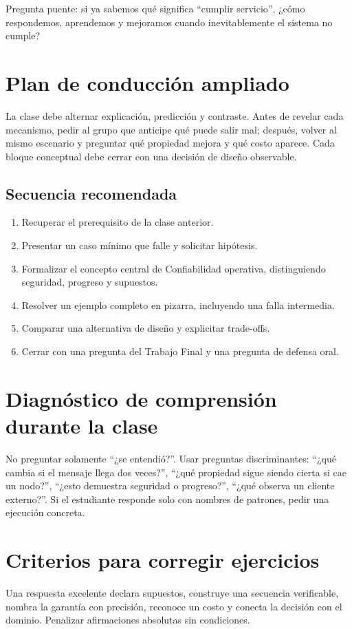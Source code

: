 \documentclass[variant=docente,cover=institutional,mode=screen]{ua-engineering-v6-article}
\begin{document}
\begin{uakeybox}
Pregunta puente: si ya sabemos qué significa “cumplir servicio”, ¿cómo respondemos, aprendemos y mejoramos cuando inevitablemente el sistema no cumple?
\end{uakeybox}


\section{Plan de conducción ampliado}
La clase debe alternar explicación, predicción y contraste. Antes de revelar cada mecanismo, pedir al grupo que anticipe qué puede salir mal; después, volver al mismo escenario y preguntar qué propiedad mejora y qué costo aparece. Cada bloque conceptual debe cerrar con una decisión de diseño observable.
\subsection*{Secuencia recomendada}
\begin{enumerate}
\item Recuperar el prerequisito de la clase anterior.
\item Presentar un caso mínimo que falle y solicitar hipótesis.
\item Formalizar el concepto central de Confiabilidad operativa, distinguiendo seguridad, progreso y supuestos.
\item Resolver un ejemplo completo en pizarra, incluyendo una falla intermedia.
\item Comparar una alternativa de diseño y explicitar trade-offs.
\item Cerrar con una pregunta del Trabajo Final y una pregunta de defensa oral.
\end{enumerate}
\section{Diagnóstico de comprensión durante la clase}
No preguntar solamente ``¿se entendió?''. Usar preguntas discriminantes: ``¿qué cambia si el mensaje llega dos veces?'', ``¿qué propiedad sigue siendo cierta si cae un nodo?'', ``¿esto demuestra seguridad o progreso?'', ``¿qué observa un cliente externo?''. Si el estudiante responde solo con nombres de patrones, pedir una ejecución concreta.
\section{Criterios para corregir ejercicios}
Una respuesta excelente declara supuestos, construye una secuencia verificable, nombra la garantía con precisión, reconoce un costo y conecta la decisión con el dominio. Penalizar afirmaciones absolutas sin condiciones.
\end{document}
